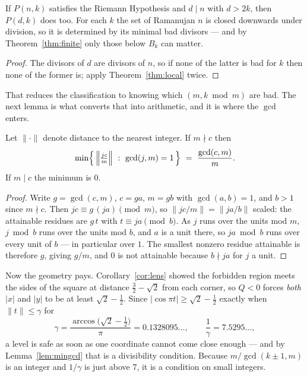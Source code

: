 \begin{corollary}\label{cor:divclosed}
If $P(n,k)$ satisfies the Riemann Hypothesis and $d\mid n$ with $d>2k$, then
$P(d,k)$ does too. For each $k$ the set of Ramanujan $n$ is closed downwards
under division, so it is determined by its minimal bad divisors --- and by
Theorem~\ref{thm:finite} only those below $B_k$ can matter.
\end{corollary}

\begin{proof}
The divisors of $d$ are divisors of $n$, so if none of the latter is bad for $k$
then none of the former is; apply Theorem~\ref{thm:local} twice.
\end{proof}

That reduces the classification to knowing which $(m,k\bmod m)$ are bad. The
next lemma is what converts that into arithmetic, and it is where the $\gcd$
enters.

\begin{lemma}\label{lem:mingcd}
Let $\|\cdot\|$ denote distance to the nearest integer. If $m\nmid c$ then
\[
  \min\Bigl\{\,\Bigl\|\tfrac{jc}{m}\Bigr\|\ :\ \gcd(j,m)=1\,\Bigr\}
  \ =\ \frac{\gcd(c,m)}{m}.
\]
If $m\mid c$ the minimum is $0$.
\end{lemma}

\begin{proof}
Write $g=\gcd(c,m)$, $c=ga$, $m=gb$ with $\gcd(a,b)=1$, and $b>1$ since
$m\nmid c$. Then $jc\equiv g\,(ja)\pmod m$, so $\|jc/m\|=\|ja/b\|$ scaled: the
attainable residues are $g\,t$ with $t\equiv ja\pmod b$. As $j$ runs over the
units mod $m$, $j\bmod b$ runs over the units mod $b$, and $a$ is a unit there,
so $ja\bmod b$ runs over every unit of $b$ --- in particular over $1$. The
smallest nonzero residue attainable is therefore $g$, giving $g/m$, and $0$ is
not attainable because $b\nmid ja$ for $j$ a unit.
\end{proof}

Now the geometry pays. Corollary~\ref{cor:lens} showed the forbidden region
meets the sides of the square at distance $\tfrac32-\sqrt2$ from each corner, so
$Q<0$ forces \emph{both} $|x|$ and $|y|$ to be at least $\sqrt2-\tfrac12$. Since
$|\cos\pi t|\ge\sqrt2-\tfrac12$ exactly when $\|t\|\le\gamma$ for
\[
  \gamma=\frac{\arccos\bigl(\sqrt2-\tfrac12\bigr)}{\pi}=0.1328095\ldots,
  \qquad \frac1\gamma=7.5295\ldots,
\]
a level is safe as soon as one coordinate cannot come close enough --- and by
Lemma~\ref{lem:mingcd} that is a divisibility condition. Because $m/\gcd(k\pm1,m)$
is an integer and $1/\gamma$ is just above $7$, it is a condition on small
integers.

